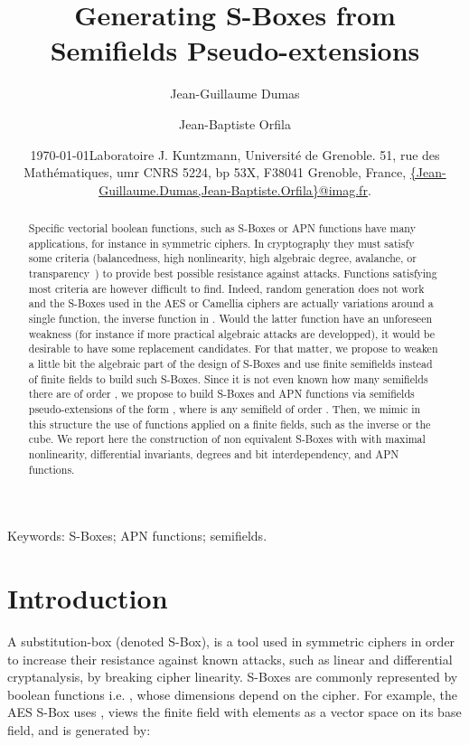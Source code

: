 \documentclass{article}\usepackage{amsthm}
\date{\today}
\title{Generating S-Boxes from Semifields Pseudo-extensions}
\author{Jean-Guillaume Dumas \and Jean-Baptiste Orfila}
\date{\small Laboratoire J. Kuntzmann, Universit\'e de Grenoble. 51, rue des
  Math\'ematiques, umr CNRS 5224, bp 53X, F38041 Grenoble, France,
\href{mailto:Jean-Guillaume.Dumas@imag.fr,Jean-Baptiste.Orfila@imag.fr}{\{Jean-Guillaume.Dumas,Jean-Baptiste.Orfila\}@imag.fr}.
}
\newcommand{\SBox}{S-Box\xspace}
\newcommand{\SBoxes}{S-Boxes\xspace}
\begin{document}
\maketitle












\begin{abstract}
  Specific vectorial boolean functions, such as \SBoxes or APN functions have many
applications, for instance in symmetric ciphers. 
In cryptography they must satisfy some criteria (balancedness, high
nonlinearity, high algebraic degree, avalanche, or
transparency~\cite{Alvarez:2008:apn,Prouff:2005:transparency}) to provide best
possible resistance against attacks.
Functions satisfying most criteria are however difficult to find. 
Indeed, random generation does not
work~\cite{Danjean:2007:pasco,Hussain:2012:chaotic} and the \SBoxes used in the AES
or Camellia ciphers are actually variations around a single function, the inverse
function in . Would the latter function have an unforeseen weakness (for instance if more
practical algebraic attacks are developped), it would be desirable to have some
replacement candidates. For that matter, we propose to weaken a little bit the algebraic part of the
design of \SBoxes and use finite semifields instead of finite fields to build
such \SBoxes. Since it is not even known how
many semifields there are of order , we propose
to build \SBoxes and APN functions via semifields pseudo-extensions of the form ,
where  is any semifield of order . Then, we mimic in this
structure the use of functions applied on a finite fields, such as the inverse or
the cube. We report here the construction of  non equivalent \SBoxes with with maximal nonlinearity, differential invariants, degrees
 and bit interdependency, and  APN functions.

\end{abstract}


Keywords: \SBoxes; APN functions; semifields.
\section{Introduction}


A substitution-box (denoted \SBox), is a tool used in
symmetric ciphers in order to increase their resistance against known
attacks, such as linear and differential cryptanalysis, by breaking cipher linearity.
\SBoxes are commonly represented by boolean functions i.e.  , whose dimensions  depend on the cipher. 
For example, the AES \SBox uses , views the finite field with 
elements as a vector space on its base field, and is generated by: 
\end{document}
